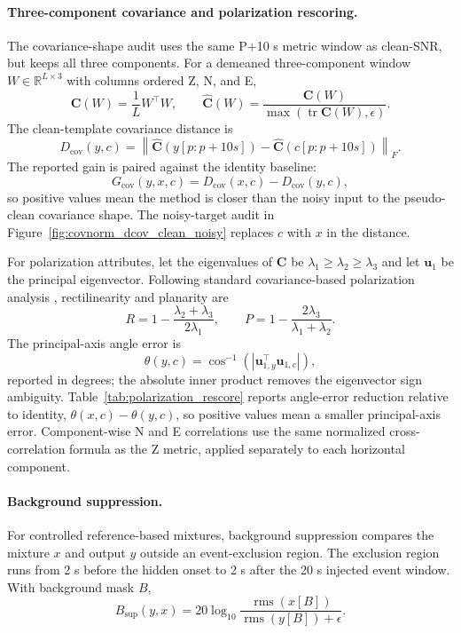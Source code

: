 \documentclass[review,12pt,authoryear]{elsarticle}
\begin{document}
\paragraph{Three-component covariance and polarization rescoring.}
The covariance-shape audit uses the same P+10 s metric window as clean-SNR, but keeps all three components. For a demeaned three-component window $W\in\mathbb{R}^{L\times 3}$ with columns ordered Z, N, and E,
\begin{equation}
\bm{C}(W)=\frac{1}{L}W^\top W,\qquad
\hat{\bm{C}}(W)=\frac{\bm{C}(W)}{\max(\operatorname{tr}\bm{C}(W),\epsilon)} .
\end{equation}
The clean-template covariance distance is
\begin{equation}
D_{\operatorname{cov}}(y,c)=
\left\|\hat{\bm{C}}(y[p:p+10s])-\hat{\bm{C}}(c[p:p+10s])\right\|_F .
\end{equation}
The reported gain is paired against the identity baseline:
\begin{equation}
G_{\operatorname{cov}}(y,x,c)=D_{\operatorname{cov}}(x,c)-D_{\operatorname{cov}}(y,c),
\end{equation}
so positive values mean the method is closer than the noisy input to the pseudo-clean covariance shape. The noisy-target audit in Figure~\ref{fig:covnorm_dcov_clean_noisy} replaces $c$ with $x$ in the distance.

For polarization attributes, let the eigenvalues of $\bm{C}$ be $\lambda_1\geq\lambda_2\geq\lambda_3$ and let $\bm{u}_1$ be the principal eigenvector. Following standard covariance-based polarization analysis \citep{jurkevics1988,vidale1986}, rectilinearity and planarity are
\begin{equation}
R=1-\frac{\lambda_2+\lambda_3}{2\lambda_1},\qquad
P=1-\frac{2\lambda_3}{\lambda_1+\lambda_2}.
\end{equation}
The principal-axis angle error is
\begin{equation}
\theta(y,c)=
\cos^{-1}\left(\left|\bm{u}_{1,y}^{\top}\bm{u}_{1,c}\right|\right),
\end{equation}
reported in degrees; the absolute inner product removes the eigenvector sign ambiguity. Table~\ref{tab:polarization_rescore} reports angle-error reduction relative to identity, $\theta(x,c)-\theta(y,c)$, so positive values mean a smaller principal-axis error. Component-wise N and E correlations use the same normalized cross-correlation formula as the Z metric, applied separately to each horizontal component.

\paragraph{Background suppression.}
For controlled reference-based mixtures, background suppression compares the mixture $x$ and output $y$ outside an event-exclusion region. The exclusion region runs from 2 s before the hidden onset to 2 s after the 20 s injected event window. With background mask $B$,
\begin{equation}
B_{\operatorname{sup}}(y,x)=
20\log_{10}
\frac{\operatorname{rms}(x[B])}
{\operatorname{rms}(y[B])+\epsilon}.
\end{equation}
\end{document}

